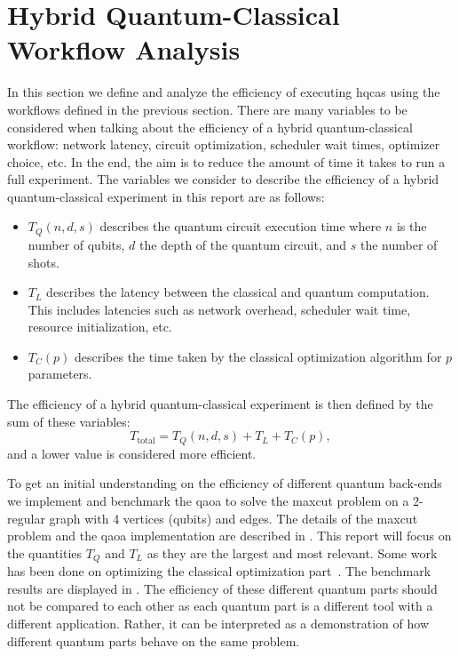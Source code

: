 \section{Hybrid Quantum-Classical Workflow Analysis}
In this section we define and analyze the efficiency of executing \glspl{hqca} using the workflows defined in the previous section.
There are many variables to be considered when talking about the efficiency of a hybrid quantum-classical workflow: network latency, circuit optimization, scheduler wait times, optimizer choice, etc.
In the end, the aim is to reduce the amount of time it takes to run a full experiment.
The variables we consider to describe the efficiency of a hybrid quantum-classical experiment in this report are as follows:
\begin{itemize}
    \item $T_Q(n, d, s)$ describes the quantum circuit execution time where $n$ is the number of qubits, $d$ the depth of the quantum circuit, and $s$ the number of shots.
    \item $T_L$ describes the latency between the classical and quantum computation. This includes latencies such as network overhead, scheduler wait time, resource initialization, etc.
    \item $T_C(p)$ describes the time taken by the classical optimization algorithm for $p$ parameters.
\end{itemize}
The efficiency of a hybrid quantum-classical experiment is then defined by the sum of these variables:
\begin{equation}
T_\text{total} = T_Q(n, d, s) + T_L + T_C(p),
\end{equation}
and a lower value is considered more efficient.

To get an initial understanding on the efficiency of different quantum back-ends we implement and benchmark the \gls{qaoa} to solve the \gls{maxcut} problem on a 2-regular graph with 4 vertices (qubits) and edges.
The details of the \gls{maxcut} problem and the \gls{qaoa} implementation are described in .
This report will focus on the quantities $T_Q$ and $T_L$ as they are the largest and most relevant.
Some work has been done on optimizing the classical optimization part~\cite{lavrijsen2020classical, sung2020exploration}.
The benchmark results are displayed in .
The efficiency of these different quantum parts should not be compared to each other as each quantum part is a different tool with a different application.
Rather, it can be interpreted as a demonstration of how different quantum parts behave on the same problem.

